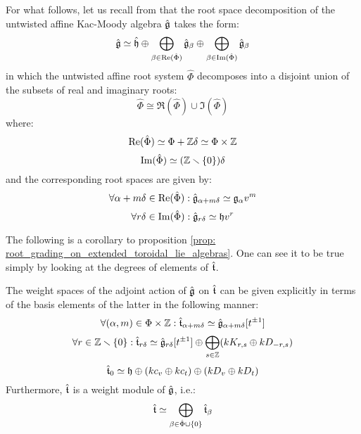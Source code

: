         \begin{remark}
            For what follows, let us recall from \cite[Chapter 7]{kac_infinite_dimensional_lie_algebras} that the root space decomposition of the untwisted affine Kac-Moody algebra $\hat{\mathfrak{g}}$ takes the form:
                $$\hat{\mathfrak{g}} \simeq \hat{\mathfrak{h}} \oplus \bigoplus_{\beta \in \operatorname{Re}(\hat{\Phi})} \hat{\mathfrak{g}}_{\beta} \oplus \bigoplus_{\beta \in \operatorname{Im}(\hat{\Phi})} \hat{\mathfrak{g}}_{\beta}$$
            in which the untwisted affine root system $\hat{\Phi}$ decomposes into a disjoint union of the subsets of real and imaginary roots:
                $$\hat{\Phi} \cong \Re(\hat{\Phi}) \cup \Im(\hat{\Phi})$$
            where:
                $$\Re(\hat{\Phi}) \cong \Phi + \Z\delta \cong \Phi \x \Z$$
                $$\operatorname{Im}(\hat{\Phi}) \simeq (\mathbb{Z} \smallsetminus \{0\})\delta$$
            and the corresponding root spaces are given by:
                $$\forall \alpha + m\delta \in \operatorname{Re}(\hat{\Phi}): \hat{\mathfrak{g}}_{\alpha + m\delta} \simeq \mathfrak{g}_{\alpha} v^m$$
                $$\forall r\delta \in \operatorname{Im}(\hat{\Phi}): \hat{\mathfrak{g}}_{r\delta} \simeq \mathfrak{h} v^r$$
        \end{remark}    
        The following is a corollary to proposition \ref{prop: root_grading_on_extended_toroidal_lie_algebras}. One can see it to be true simply by looking at the degrees of elements of $\hat{\mathfrak{t}}$. 
        \begin{theorem} \label{theorem: root_grading_for_extended_toroidal_lie_algebras}
            The weight spaces of the adjoint action of $\hat{\mathfrak{g}}$ on $\hat{\mathfrak{t}}$ can be given explicitly in terms of the basis elements of the latter in the following manner:
                $$\forall (\alpha, m) \in \Phi \x \Z: \extendedtoroidal_{\alpha + m\delta} \cong \hat{\g}_{\alpha + m\delta}[t^{\pm 1}]$$
                $$
                    \forall r \in \mathbb{Z} \smallsetminus \{0\}: \hat{\mathfrak{t}}_{r\delta} \simeq \hat{\mathfrak{g}}_{r\delta}[t^{\pm 1}] \oplus \bigoplus_{s \in \mathbb{Z}} ( k K_{r, s} \oplus k D_{-r, s} )
                $$
                $$\hat{\mathfrak{t}}_0 \simeq \mathfrak{h} \oplus (k c_v \oplus k c_t) \oplus (k D_v \oplus k D_t)$$
            Furthermore, $\hat{\mathfrak{t}}$ is a weight module of $\hat{\mathfrak{g}}$, i.e.:
                $$\hat{\mathfrak{t}} \simeq \bigoplus_{\beta \in \hat{\Phi} \cup \{0\}} \hat{\mathfrak{t}}_{\beta}$$
        \end{theorem}
